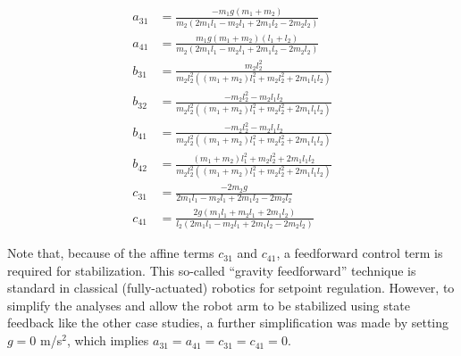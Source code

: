 \begin{subequations}
\begin{align}
	a_{31} &= \frac{-m_{1}g(m_{1} + m_{2})}{m_{2}(2m_{1}l_{1} -m_{2}l_{1}
		+ 2m_{1}l_{2} - 2m_{2}l_{2})}\\
	a_{41} &= \frac{m_{1}g(m_{1} + m_{2})(l_{1} + l_{2})}{m_{2}(2m_{1}l_{1}
		- m_{2}l_{1} + 2m_{1}l_{2} - 2m_{2}l_{2})}\\
	b_{31} &= \frac{m_{2}l_{2}^{2}}{m_{2}l_{2}^{2}((m_{1} + m_{2})l_{1}^{2}
		+ m_{2}l_{2}^{2} + 2m_{1}l_{1}l_{2})}\\
	b_{32} &= \frac{-m_{2}l_{2}^{2} - m_{2}l_{1}l_{2}}{m_{2}l_{2}^{2}((m_{1}
		+ m_{2})l_{1}^{2} + m_{2}l_{2}^{2} + 2m_{1}l_{1}l_{2})}\\
	b_{41} &=\frac{-m_{2}l_{2}^{2} - m_{2}l_{1}l_{2}}{m_{2}l_{2}^{2}((m_{1}
		+ m_{2})l_{1}^{2} + m_{2}l_{2}^{2} + 2m_{1}l_{1}l_{2})}\\
	b_{42} &= \frac{(m_{1} + m_{2})l_{1}^{2} + m_{2}l_{2}^{2}
		+ 2m_{1}l_{1}l_{2}}{m_{2}l_{2}^{2}((m_{1} + m_{2})l_{1}^{2}
		+ m_{2}l_{2}^{2} + 2m_{1}l_{1}l_{2})}\\
	c_{31} &= \frac{-2m_{2}g}{2m_{1}l_{1} -m_{2}l_{1} + 2m_{1}l_{2} - 2m_{2}l_{2}}\\
	c_{41} &= \frac{2g(m_{1}l_{1} + m_{2}l_{1} + 2m_{1}l_{2})}{l_{2}(2m_{1}l_{1} -m_{2}l_{1} + 2m_{1}l_{2} - 2m_{2}l_{2})}
\end{align}
\end{subequations}

Note that, because of the affine terms $c_{31}$ and $c_{41}$, a feedforward control term is required for stabilization.  This so-called ``gravity feedforward'' technique is standard in classical (fully-actuated) robotics for setpoint regulation.  However, to simplify the analyses and allow the robot arm to be stabilized using state feedback like the other case studies, a further simplification was made by setting $g = 0$ m/s$^{2}$, which implies $a_{31} = a_{41} = c_{31} = c_{41} = 0$.

